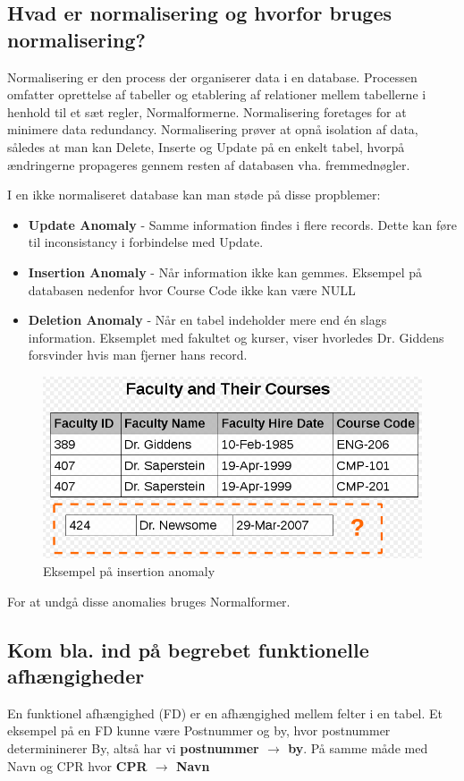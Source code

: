 \newpage

\subsection{Hvad er normalisering og hvorfor bruges normalisering?}\label{sec:normal}
Normalisering er den process der organiserer data i en database. Processen omfatter oprettelse af tabeller og etablering af relationer mellem tabellerne i henhold til et sæt regler, Normalformerne. Normalisering foretages for at minimere data redundancy. Normalisering prøver at opnå isolation af data, således at man kan Delete, Inserte og Update på en enkelt tabel, hvorpå ændringerne propageres gennem resten af databasen vha. fremmednøgler.

I en ikke normaliseret database kan man støde på disse propblemer:

\begin{itemize}
	\item \textbf{Update Anomaly} - Samme information findes i flere records. Dette kan føre til inconsistancy i forbindelse med Update.
	\item \textbf{Insertion Anomaly} - Når information ikke kan gemmes. Eksempel på databasen nedenfor hvor Course Code ikke kan være NULL
	\item \textbf{Deletion Anomaly} - Når en tabel indeholder mere end én slags information. Eksemplet med fakultet og kurser, viser hvorledes Dr. Giddens forsvinder hvis man fjerner hans record.	
\end{itemize}

\begin{figure}[H]
	\centering
	\includegraphics[width=0.7\linewidth]{figs/spm5/insertionAnomaly.PNG}
	\caption{Eksempel på insertion anomaly}
	\label{fig:insertionAnomaly}
\end{figure}

For at undgå disse anomalies bruges Normalformer.

\subsection{Kom bla. ind på begrebet funktionelle afhængigheder}
En funktionel afhængighed (FD) er en afhængighed mellem felter i en tabel.
Et eksempel på en FD kunne være Postnummer og by, hvor postnummer determininerer By, altså har vi \textbf{postnummer $\rightarrow$ by}. På samme måde med Navn og CPR hvor \textbf{CPR $\rightarrow$ Navn}

